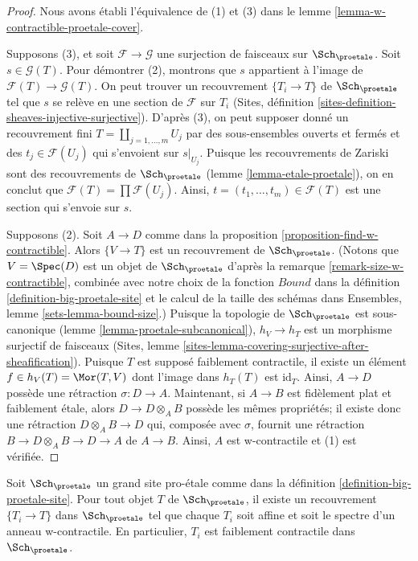 \begin{proof}
Nous avons établi l'équivalence de (1) et (3) dans le
lemme \ref{lemma-w-contractible-proetale-cover}.

\medskip\noindent
Supposons (3), et soit $\mathcal{F} \to \mathcal{G}$ une surjection de faisceaux sur
$\Sch_\proetale$. Soit $s \in \mathcal{G}(T)$. Pour démontrer (2), montrons que
$s$ appartient à l'image de $\mathcal{F}(T) \to \mathcal{G}(T)$. On peut trouver un
recouvrement $\{T_i \to T\}$ de $\Sch_\proetale$ tel que $s$ se relève
en une section de $\mathcal{F}$ sur $T_i$
(Sites, définition \ref{sites-definition-sheaves-injective-surjective}).
D'après (3), on peut supposer donné un recouvrement fini
$T = \coprod_{j = 1, \ldots, m} U_j$ par des sous-ensembles ouverts et fermés
et des $t_j \in \mathcal{F}(U_j)$ qui s'envoient sur $s|_{U_j}$.
Puisque les recouvrements de Zariski sont des recouvrements de $\Sch_\proetale$
(lemme \ref{lemma-etale-proetale}), on en conclut que
$\mathcal{F}(T) = \prod \mathcal{F}(U_j)$.
Ainsi, $t = (t_1, \ldots, t_m) \in \mathcal{F}(T)$
est une section qui s'envoie sur $s$.

\medskip\noindent
Supposons (2). Soit $A \to D$ comme dans la
proposition \ref{proposition-find-w-contractible}.
Alors $\{V \to T\}$ est un recouvrement de $\Sch_\proetale$.
(Notons que $V = \Spec(D)$ est un objet de $\Sch_\proetale$
d'après la remarque \ref{remark-size-w-contractible},
combinée avec notre choix de la fonction
$Bound$ dans la définition \ref{definition-big-proetale-site}
et le calcul de la taille des schémas dans
Ensembles, lemme \ref{sets-lemma-bound-size}.)
Puisque la topologie de $\Sch_\proetale$ est sous-canonique
(lemme \ref{lemma-proetale-subcanonical}),
$h_V \to h_T$ est un morphisme surjectif de faisceaux
(Sites, lemme \ref{sites-lemma-covering-surjective-after-sheafification}).
Puisque $T$ est supposé faiblement contractile, il existe un élément
$f \in h_V(T) = \Mor(T, V)$ dont l'image dans $h_T(T)$ est $\text{id}_T$.
Ainsi, $A \to D$ possède une rétraction $\sigma : D \to A$.
Maintenant, si $A \to B$ est fidèlement plat et faiblement \'etale, alors
$D \to D \otimes_A B$ possède les mêmes propriétés; il existe donc
une rétraction $D \otimes_A B \to D$ qui, composée avec
$\sigma$, fournit une rétraction $B \to D \otimes_A B \to D \to A$
de $A \to B$. Ainsi, $A$ est w-contractile et (1) est vérifiée.
\end{proof}

\begin{lemma}
\label{lemma-get-many-weakly-contractible}
Soit $\Sch_\proetale$ un grand site pro-\'etale comme dans la
définition \ref{definition-big-proetale-site}.
Pour tout objet $T$ de $\Sch_\proetale$, il existe
un recouvrement $\{T_i \to T\}$ dans $\Sch_\proetale$
tel que chaque $T_i$ soit affine et soit le spectre d'un anneau
w-contractile. En particulier, $T_i$ est faiblement contractile dans $\Sch_\proetale$.
\end{lemma}

